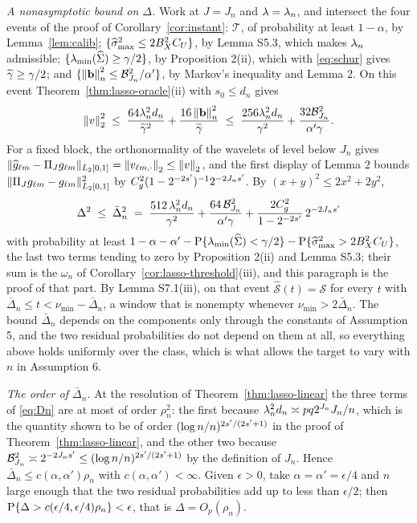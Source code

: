 \emph{A nonasymptotic bound on $\Delta$.} Work at $J = J_n$ and $\lambda = \lambda_{n}$,
and intersect the four events of the proof of Corollary~\ref{cor:instant}: $\mathcal{T}$,
of probability at least $1-\alpha$, by Lemma~\ref{lem:calib};
$\{\widehat{\sigma}_{\max}^2 \le 2B_X^2C_U\}$, by Lemma S5.3, which makes $\lambda_{n}$ admissible;
$\{\lambda_{\min}(\widehat{\Sigma}) \ge \gamma/2\}$, by Proposition 2(ii), which with
\eqref{eq:schur} gives $\widetilde{\gamma} \ge \gamma/2$; and
$\{\left\lVert \mathbf{b} \right\rVert_{n}^2 \le \mathcal{B}^2_{J_n}/\alpha'\}$, by Markov's inequality and
Lemma 2. On this event Theorem~\ref{thm:lasso-oracle}(ii) with $s_0 \le d_n$ gives
\[
  \left\lVert v \right\rVert_2^2 \;\le\; \frac{64\lambda_{n}^2d_n}{\widetilde{\gamma}^2}
  + \frac{16\left\lVert \mathbf{b} \right\rVert_{n}^2}{\widetilde{\gamma}}
  \;\le\; \frac{256\lambda_{n}^2d_n}{\gamma^2}
  + \frac{32\mathcal{B}^2_{J_n}}{\alpha'\gamma} .
\]
For a fixed block, the orthonormality of the wavelets of level below $J_n$
gives $\lVert\widehat{g}_{\ell m} - \Pi_{J}g_{\ell m}\rVert_{L_2[0,1]} =
\left\lVert v_{\ell m,\cdot} \right\rVert_2 \le \left\lVert v \right\rVert_2$, and the first display of Lemma 2
bounds $\lVert\Pi_{J}g_{\ell m} - g_{\ell m}\rVert^2_{L_2[0,1]}$ by
$C_g^2(1-2^{-2s'})^{-1}2^{-2J_ns'}$. By $(x+y)^2 \le 2x^2 + 2y^2$,
\begin{equation}
  \label{eq:Dn}
  \Delta^2 \;\le\; \bar{\Delta}_n^2 \;=\; \frac{512\,\lambda_{n}^2d_n}{\gamma^2}
  + \frac{64\,\mathcal{B}^2_{J_n}}{\alpha'\gamma}
  + \frac{2C_g^2}{1-2^{-2s'}}\,2^{-2J_ns'}
\end{equation}
with probability at least
$1 - \alpha - \alpha' - \mathrm{P}\{\lambda_{\min}(\widehat{\Sigma}) < \gamma/2\} -
\mathrm{P}\{\widehat{\sigma}_{\max}^2 > 2B_X^2C_U\}$, the last two terms tending to zero by
Proposition 2(ii) and Lemma S5.3; their sum is the
$\omega_n$ of Corollary~\ref{cor:lasso-threshold}(iii), and this paragraph is the proof of that
part. By Lemma S7.1(iii), on that event
$\widehat{\mathcal{S}}(t) = \mathcal{S}$ for every $t$ with $\bar{\Delta}_n \le t < \nu_{\min} - \bar{\Delta}_n$, a window
that is nonempty whenever $\nu_{\min} > 2\bar{\Delta}_n$. The bound $\bar{\Delta}_n$ depends on the
components only through the constants of Assumption 5, and the two residual
probabilities do not depend on them at all, so everything above holds
uniformly over the class, which is what allows the target to vary with $n$ in
Assumption 6.

\emph{The order of $\bar{\Delta}_n$.} At the resolution of Theorem~\ref{thm:lasso-linear} the three terms of
\eqref{eq:Dn} are at most of order $\rho_n^2$: the first because
$\lambda_{n}^2d_n \asymp pq2^{J_n}J_n/n$, which is the quantity shown to be of order
$(\log n/n)^{2s'/(2s'+1)}$ in the proof of Theorem~\ref{thm:lasso-linear}, and the other two
because $\mathcal{B}^2_{J_n} \asymp 2^{-2J_ns'} \le
(\log n/n)^{2s'/(2s'+1)}$ by the definition of $J_n$. Hence
$\bar{\Delta}_n \le c(\alpha,\alpha')\rho_n$ with $c(\alpha,\alpha') < \infty$. Given $\epsilon > 0$,
take $\alpha = \alpha' = \epsilon/4$ and $n$ large enough that the two
residual probabilities add up to less than $\epsilon/2$; then
$\mathrm{P}\{\Delta > c(\epsilon/4,\epsilon/4)\rho_n\} < \epsilon$, that is
$\Delta = O_p(\rho_n)$.

